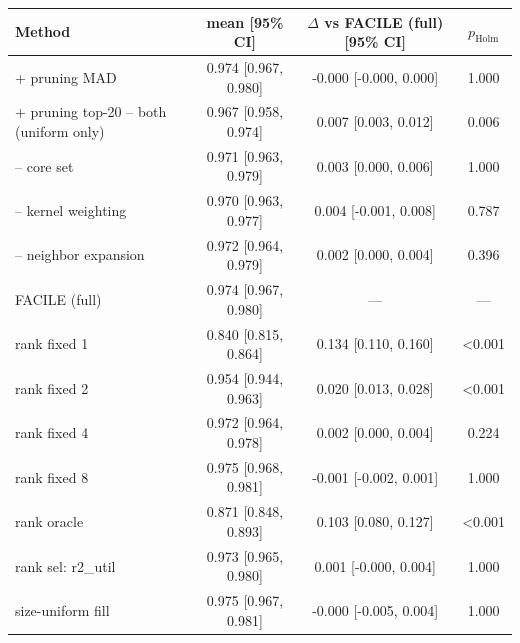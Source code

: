 \begin{tabular}{lccc}
\toprule
Method & mean [95\% CI] & $\Delta$ vs FACILE (full) [95\% CI] & $p_{\mathrm{Holm}}$ \\
\midrule
+ pruning MAD & 0.974 [0.967, 0.980] & -0.000 [-0.000, 0.000] & 1.000 \\
+ pruning top-20%
-- both (uniform only) & 0.967 [0.958, 0.974] & 0.007 [0.003, 0.012] & 0.006 \\
-- core set & 0.971 [0.963, 0.979] & 0.003 [0.000, 0.006] & 1.000 \\
-- kernel weighting & 0.970 [0.963, 0.977] & 0.004 [-0.001, 0.008] & 0.787 \\
-- neighbor expansion & 0.972 [0.964, 0.979] & 0.002 [0.000, 0.004] & 0.396 \\
FACILE (full) & 0.974 [0.967, 0.980] & --- & --- \\
rank fixed 1 & 0.840 [0.815, 0.864] & 0.134 [0.110, 0.160] & <0.001 \\
rank fixed 2 & 0.954 [0.944, 0.963] & 0.020 [0.013, 0.028] & <0.001 \\
rank fixed 4 & 0.972 [0.964, 0.978] & 0.002 [0.000, 0.004] & 0.224 \\
rank fixed 8 & 0.975 [0.968, 0.981] & -0.001 [-0.002, 0.001] & 1.000 \\
rank oracle & 0.871 [0.848, 0.893] & 0.103 [0.080, 0.127] & <0.001 \\
rank sel: r2_util & 0.973 [0.965, 0.980] & 0.001 [-0.000, 0.004] & 1.000 \\
size-uniform fill & 0.975 [0.967, 0.981] & -0.000 [-0.005, 0.004] & 1.000 \\
\bottomrule
\end{tabular}

